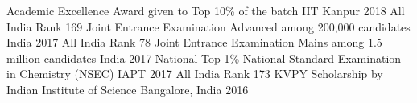 
\begin{cvhonors}
  \cvhonor
    {Academic Excellence Award}
    {given to Top 10\% of the batch}
    {IIT Kanpur}
    {2018}
  \cvhonor
    {All India Rank 169}
    {Joint Entrance Examination Advanced among 200,000 candidates}
    {India}
    {2017}
  \cvhonor
     {All India Rank 78}
    {Joint Entrance Examination Mains among 1.5 million candidates}
    {India}
    {2017}
    \cvhonor
     {National Top 1\%}
    {National Standard Examination in Chemistry (NSEC)}
    {IAPT}
    {2017}
  \cvhonor
   {All India Rank 173}
    {KVPY Scholarship by Indian Institute of Science}
    {Bangalore, India}
    {2016}
    
\end{cvhonors}


